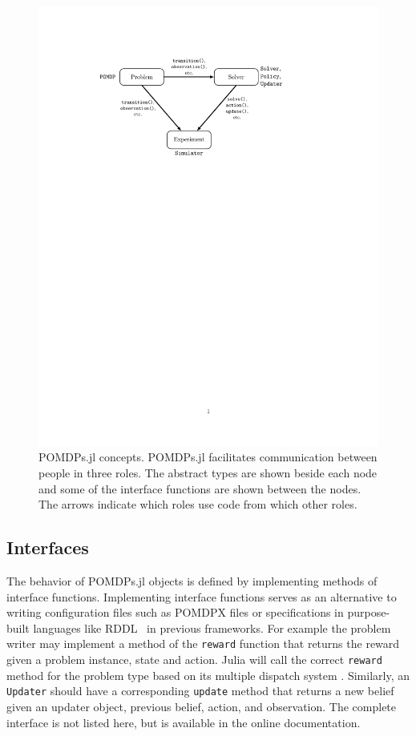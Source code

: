 \begin{figure}[htpb]
    \centering
    \includegraphics[width=0.8\linewidth]{media/arch.pdf}
    \caption[POMDPs.jl concepts]{POMDPs.jl concepts. POMDPs.jl facilitates communication between people in three roles. The abstract types are shown beside each node and some of the interface functions are shown between the nodes. The arrows indicate which roles use code from which other roles.}
    \label{fig:concepts}
\end{figure}

\subsection{Interfaces}

The behavior of POMDPs.jl objects is defined by implementing methods of interface functions.
Implementing interface functions serves as an alternative to writing configuration files such as POMDPX files or specifications in purpose-built languages like RDDL~\cite{sanner2010rddl} in previous frameworks.
For example the problem writer may implement a method of the \texttt{reward} function that returns the reward given a problem instance, state and action.
Julia will call the correct \texttt{reward} method for the problem type based on its multiple dispatch system \cite{bezanson2017julia}.
Similarly, an \texttt{Updater} should have a corresponding \texttt{update} method that returns a new belief given an updater object, previous belief, action, and observation.
The complete interface is not listed here, but is available in the online documentation.


